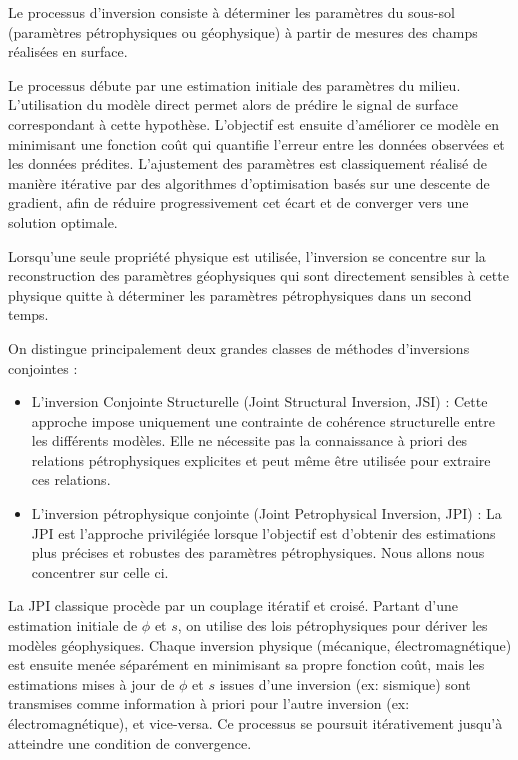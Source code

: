 Le processus d'inversion consiste à déterminer les paramètres du sous-sol (paramètres pétrophysiques ou géophysique) à partir de mesures des champs réalisées en surface.\par

Le processus débute par une estimation initiale des paramètres du milieu. L'utilisation du modèle direct permet alors de prédire le signal de surface correspondant à cette hypothèse. L'objectif est ensuite d'améliorer ce modèle en minimisant une fonction coût qui quantifie l'erreur entre les données observées et les données prédites. L'ajustement des paramètres est classiquement réalisé de manière itérative par des algorithmes d'optimisation basés sur une descente de gradient, afin de réduire progressivement cet écart et de converger vers une solution optimale.\par

Lorsqu'une seule propriété physique est utilisée, l'inversion se concentre sur la reconstruction des paramètres géophysiques qui sont directement sensibles à cette physique quitte à déterminer les paramètres pétrophysiques dans un second temps. \par 


On distingue principalement deux grandes classes de méthodes d'inversions conjointes \cite{Qin_Bohlen}: 
\begin{itemize}
    \item L'inversion Conjointe Structurelle (Joint Structural Inversion, JSI) : Cette approche impose uniquement une contrainte de cohérence structurelle entre les différents modèles. Elle ne nécessite pas la connaissance à priori des relations pétrophysiques explicites et peut même être utilisée pour extraire ces relations.
    \item L'inversion pétrophysique conjointe (Joint Petrophysical Inversion, JPI) : La JPI est l'approche privilégiée lorsque l'objectif est d'obtenir des estimations plus précises et robustes des paramètres pétrophysiques. Nous allons nous concentrer sur celle ci. 
\end{itemize}

La JPI classique procède par un couplage itératif et croisé. Partant d'une estimation initiale de $\phi$ et $s$, on utilise des lois pétrophysiques pour dériver les modèles géophysiques. Chaque inversion physique (mécanique, électromagnétique) est ensuite menée séparément en minimisant sa propre fonction coût, mais les estimations mises à jour de $\phi$ et $s$ issues d'une inversion (ex: sismique) sont transmises comme information à priori pour l'autre inversion (ex: électromagnétique), et vice-versa. Ce processus se poursuit itérativement jusqu'à atteindre une condition de convergence. \par 

